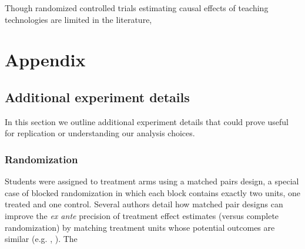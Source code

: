 \documentclass[12pt]{article}
\begin{document}
Though randomized controlled trials estimating causal effects of teaching technologies are limited in the literature,

\printbibliography


\clearpage


\clearpage


\clearpage


\clearpage


\clearpage


\clearpage






\clearpage

\section*{Appendix}

\renewcommand{\thesubsection}{\Alph{subsection}}

\setcounter{table}{0}
\renewcommand{\thetable}{A\arabic{table}}

\subsection{Additional experiment details}

In this section we outline additional experiment details that could prove useful for replication or understanding our analysis choices.

\subsubsection{Randomization} \label{a_randomization}
Students were assigned to treatment arms using a matched pairs design, a special case of blocked randomization in which each block contains exactly two units, one treated and one control. Several authors detail how matched pair designs can improve the \textit{ex ante} precision of treatment effect estimates (versus complete randomization) by matching treatment units whose potential outcomes are similar (e.g. \cite{ir2015}, \cite{ai2017}). The
\end{document}
